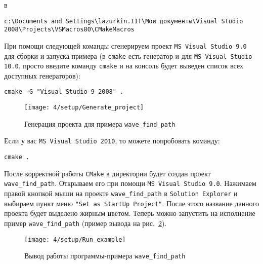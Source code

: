 в

{\footnotesize
\begin{verbatim}
c:\Documents and Settings\lazurkin.IIT\Мои документы\Visual Studio 2008\Projects\VSMacros80\CMakeMacros
\end{verbatim}
}

При помощи следующей команды сгенерируем проект \texttt{MS Visual
  Studio 9.0} для сборки и запуска примера (в \texttt{cmake} есть
генератор и для \texttt{MS Visual Studio 10.0}, просто введите команду
\texttt{cmake} и на консоль будет выведен список всех доступных
генераторов):

\begin{verbatim}
cmake -G "Visual Studio 9 2008" .
\end{verbatim}

\begin{figure}[h!]
  \centering
  \texttt{[image: 4/setup/Generate\_project]}
  \caption{Генерация проекта для примера \texttt{wave\_find\_path}}
  \label{fig:gen_project}
\end{figure}

Если у вас \texttt{MS Visual Studio 2010}, то можете попробовать
команду:

\begin{verbatim}
cmake .
\end{verbatim}

После корректной работы \texttt{CMake} в директории будет создан
проект \verb|wave_find_path|. Открываем его при помощи \texttt{MS
  Visual Studio 9.0}. Нажимаем правой кнопкой мыши на проекте
\verb|wave_find_path| в \texttt{Solution Explorer} и выбираем пункт
меню \texttt{"Set as StartUp Project"}. После этого название данного
проекта будет выделено жирным цветом. Теперь можно запустить на
исполнение пример \verb|wave_find_path| (пример вывода на
рис.~\ref{fig:run_example}).

\begin{figure}[h!]
  \centering
  \texttt{[image: 4/setup/Run\_example]}
  \caption{Вывод работы программы-примера \texttt{wave\_find\_path}}
  \label{fig:run_example}
\end{figure}

